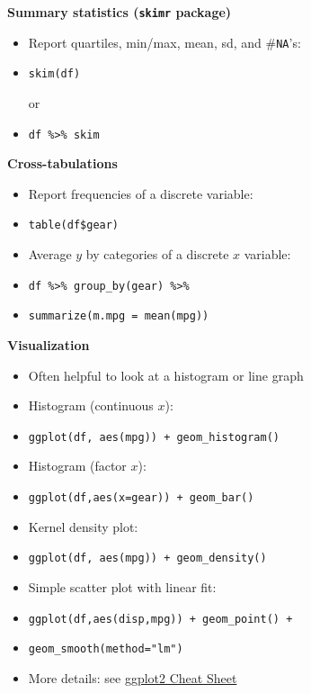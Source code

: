 \documentclass[10pt,landscape]{article}
\begin{document}
\begin{multicols}{3}
\smallskip{}

\textbf{Summary statistics (\texttt{skimr} package)}\\
\begin{itemize}
    \item Report quartiles, min/max, mean, sd, and \#\verb!NA!'s:
    \item[] \verb!skim(df)!
    
    or
    \item[] \verb!df %>% skim!
\end{itemize}

\smallskip{}

\textbf{Cross-tabulations}\\
\begin{itemize}
    \item Report frequencies of a discrete variable:
    \item[] \verb!table(df$gear)!
    \item Average $y$ by categories of a discrete $x$ variable:
    \item[] \verb!df %>% group_by(gear) %>% !
    \item[] \verb!summarize(m.mpg = mean(mpg))!
\end{itemize}

\smallskip{}

\textbf{Visualization}\\
\begin{itemize}
    \item Often helpful to look at a histogram or line graph
    \item Histogram (continuous $x$):
    \item[] \verb!ggplot(df, aes(mpg)) + geom_histogram()!
    \item Histogram (factor $x$):
    \item[] \verb!ggplot(df,aes(x=gear)) + geom_bar()!
    \item Kernel density plot:
    \item[] \verb!ggplot(df, aes(mpg)) + geom_density()!
    \item Simple scatter plot with linear fit:
    \item[] \verb!ggplot(df,aes(disp,mpg)) + geom_point() +!
    \item[] \verb!geom_smooth(method="lm")!
    \item More details: see \href{https://www.rstudio.com/wp-content/uploads/2015/03/ggplot2-cheatsheet.pdf}{ggplot2 Cheat Sheet}
\end{itemize}



\end{multicols}
\end{document}
